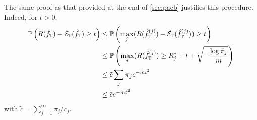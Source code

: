The same proof as that provided at the end of  \cref{sec:pacb} justifies this procedure. Indeed, for $t>0$,
\begin{align*}
\bm{\mathbb P}\left(R({\hat{f}}_{\mathbb T}) - \tilde {{\mathcal E}}_{\mathbb T}({\hat{f}}_{\mathbb T}) \geq t\right) & \leq \bm{\mathbb P}\left(\max_{j} (R({\hat{f}}^{(j)}_{\mathbb T}) - \tilde {{\mathcal E}}_{\mathbb T}({\hat{f}}^{(j)}_{\mathbb T})) \geq t\right)\\
& \leq \bm{\mathbb P}\left(\max_{j} (R({\hat{f}}^{(j)}_{\mathbb T})  \geq R^*_j + t + \sqrt{-\frac{\log \tilde \pi_j}{m}}\right)\\
&\leq  \tilde c \sum_j \pi_j e^{-mt^2} \\
&\leq \tilde ce^{-mt^2}
\end{align*}
with $\tilde c = \sum_{j=1}^\infty \pi_j/c_j$.
%



